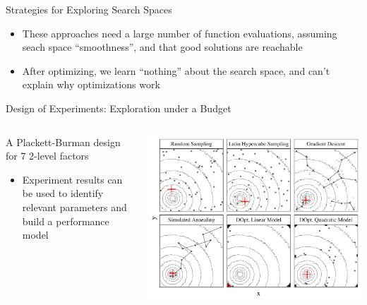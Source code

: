 \documentclass[11pt, compress, aspectratio=169, xcolor={table,usenames,dvipsnames}]{beamer}
\begin{document}
\begin{frame}
\begin{columns}
\begin{column}{0.89\columnwidth}
\begin{columns}
\begin{column}[t]{0.48\columnwidth}
\begin{block}{Strategies for Exploring Search Spaces}
\begin{itemize}
\item These approaches need a \alert{large number of function evaluations},
assuming seach space \alert{``smoothness''}, and that good solutions
are \alert{reachable}
\item After optimizing, we \alert{learn ``nothing''} about the search space, and
\alert{can't explain} why optimizations work
\end{itemize}
\end{block}
\begin{block}{Design of Experiments: Exploration under a Budget}
\begin{columns}
\begin{column}{0.39\columnwidth}
{\scriptsize

}
\begin{center}
{\tiny
A \alert{Plackett-Burman} design \\[-0.5em] for \alert{7 2-level factors}
}
\end{center}
\vspace{0.2em}
\begin{itemize}
\item \alert{Experiment results} can be used to
identify \alert{relevant parameters}
and \alert{build a performance model}
\end{itemize}
\end{column}
\begin{column}{0.59\columnwidth}
\begin{center}
\begin{center}
\includegraphics[width=0.98\columnwidth]{../../../img/sampling_comparison.pdf}
\end{center}
\end{center}


\end{column}
\end{columns}
\end{block}
\end{column}
\end{columns}
\end{column}
\end{columns}
\end{frame}
\end{document}
